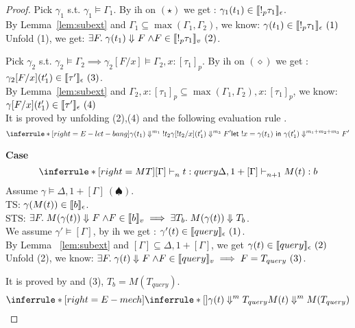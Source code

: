 \documentclass{article}
\begin{document}
\begin{proof}
  Pick $\gamma_1$ s.t. $\gamma_1 \vDash \Gamma_1 $. By ih on $(\star)$ we get : $ \gamma_1(t_1) \in \llbracket {!_p \tau_1 } \rrbracket_{\epsilon}$. \\
  By Lemma~\ref{lem:subext} and $\Gamma_1 \subseteq \max(\Gamma_1,\Gamma_2)$, we know: $ \gamma(t_1) \in \llbracket {!_p \tau_1 } \rrbracket_{\epsilon}~(1) $\\
  Unfold (1), we get: $\exists F. \mathrel{ {\gamma(t_1)} \Downarrow^{} {F} } \land F \in \llbracket { !_p \tau_1} \rrbracket_{v}~(2)  $.  
 
  Pick $\gamma_2$ s.t. $\gamma_2 \vDash \Gamma_2 \implies \gamma_2[F/x] \vDash \Gamma_2, x:[\tau_1]_p $. By ih on $(\diamond)$ we get : $ \gamma_2[F/x](t_1') \in \llbracket { \tau' } \rrbracket_{\epsilon} ~(3)$. \\
  By Lemma~\ref{lem:subext} and $\Gamma_2, x:[\tau_1]_p \subseteq \max(\Gamma_1,\Gamma_2), x:[\tau_1]_p$, we know: $ \gamma[F/x](t_1') \in \llbracket { \tau' } \rrbracket_{\epsilon}~(4) $\\
  

    It is proved by unfolding (2),(4) and the following evaluation rule .
   \[
   \inferrule*[ right=E-let-bang]
  {   
    { \eval{ \gamma(t_1) }{ !t_2  }{m_1} } 
    \\
    { \eval{\gamma[!t_2/x](t_1') }{ F'}{m_3 } }
  }
  { \eval{  \letx{!x}{\gamma(t_1)}{\gamma(t_1')}  }{ F'  }{ m_1+m_2+m_3  } }  
   \]
  
  
  
   \noindent \textbf{Case} 
   \[
      \inferrule*[ right = MT ]
   {[\Gamma] \jtype{n}{}{t}{query}}
   {\Delta, 1 + [\Gamma] \jtype{n+1}{}{M(t)}{b}  }
   \]
   Assume $\gamma \vDash{\Delta,1+[\Gamma]}~(\spadesuit)$.\\
   TS: $\gamma(M(t)) \in \llbracket {b} \rrbracket_{\epsilon}$.\\
   STS: $\exists F. \mathrel{ {M(\gamma(t))} \Downarrow^{} {F} } \land F \in \llbracket {b} \rrbracket_{v} \implies \exists T_{b}. \mathrel{ {M(\gamma(t))} \Downarrow^{} {T_{b}} }$.\\
   We assume $\gamma' \vDash{[\Gamma]} $,
   by ih we get : $ \gamma'(t) \in \llbracket {query} \rrbracket_{\epsilon}~(1)$.\\
   By Lemma ~\ref{lem:subext} and $[\Gamma] \subseteq \Delta, 1+[\Gamma] $, we get $ \gamma(t) \in \llbracket {query} \rrbracket_{\epsilon}~(2)$\\
   Unfold (2), we know: $\exists F. \mathrel{ {\gamma(t)} \Downarrow^{} {F} } \land F \in \llbracket {query} \rrbracket_{v} \implies F = T_{query} ~(3) $. 
   
   It is proved by  and (3), $T_b =M( T_{query})$.
   \[
     \inferrule*[ right=E-mech]
  { 
    \inferrule*[]
    {}
    {\eval{  \gamma(t)  }{ T_{query} }{m }  }
  }
  { \eval{  M(t)  }{ M(T_{query})  }{  m } }
   \]
  

\end{proof}
\end{document}
